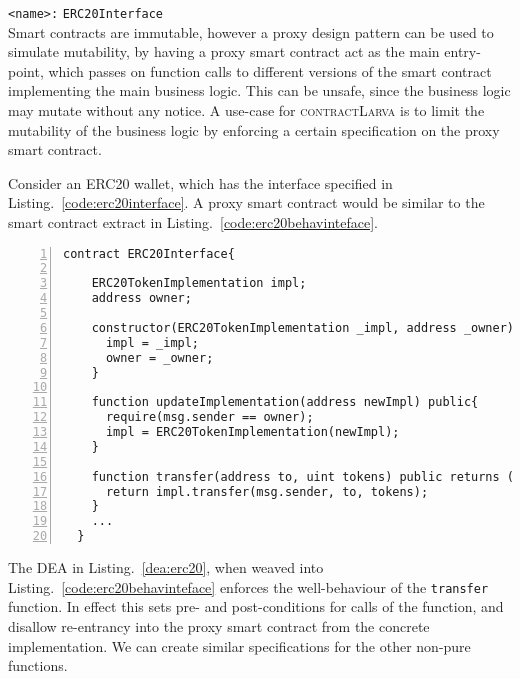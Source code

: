 \documentclass{article}
\newcommand{\contractlarva}{\textsc{contractLarva}\xspace}
\begin{document}
        \texttt{<name>:} \verb+ERC20Interface+\\
 
 Smart contracts are immutable, however a proxy design pattern can be used to simulate mutability, by having a proxy smart contract act as the main entry-point, which passes on function calls to different versions of the smart contract implementing the main business logic. This can be unsafe, since the business logic may mutate without any notice. A use-case for \contractlarva is to limit the mutability of the business logic by enforcing a certain specification on the proxy smart contract.
 
 Consider an ERC20 wallet, which has the interface specified in Listing.~\ref{code:erc20interface}. A proxy smart contract would be similar to the smart contract extract in Listing.~\ref{code:erc20behavinteface}.
      
  \small\begin{lstlisting}[language=DEA,basicstyle=\scriptsize,numbers=left,numbersep=2pt,xleftmargin=0.3cm,escapechar=\%,label={code:erc20behavinteface},caption={Extract from ERC20 proxy interface.}]
  contract ERC20Interface{
    
    ERC20TokenImplementation impl;
    address owner;
  
    constructor(ERC20TokenImplementation _impl, address _owner) public{
      impl = _impl;
      owner = _owner;
    }
    
    function updateImplementation(address newImpl) public{
      require(msg.sender == owner);
      impl = ERC20TokenImplementation(newImpl);
    }
    
    function transfer(address to, uint tokens) public returns (bool success){
      return impl.transfer(msg.sender, to, tokens);  
    }
    ...
  }
      \end{lstlisting}\normalsize
      
  The DEA in Listing.~\ref{dea:erc20}, when weaved into Listing.~\ref{code:erc20behavinteface} enforces the well-behaviour of the \texttt{transfer} function. In effect this sets pre- and post-conditions for calls of the function, and disallow re-entrancy into the proxy smart contract from the concrete implementation. We can create similar specifications for the other non-pure functions.
  
\end{document}
